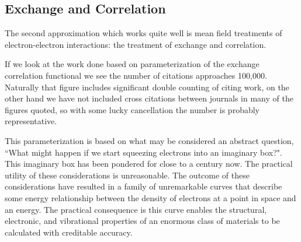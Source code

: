 \subsection{Exchange and Correlation}
The second approximation which works quite well is mean field treatments of 
electron-electron interactions: the treatment of exchange and correlation. 

If we look at the work done based on parameterization of the exchange correlation functional 
we see the number of citations approaches 100,000. Naturally that figure includes significant 
double counting of citing work, on the other hand we have not included cross citations 
between journals in many of the figures quoted, so with some lucky 
cancellation the number is probably representative. 

This parameterization is based on what may be considered an abstract question,
``What might happen if we start squeezing electrons into an imaginary box?".
This imaginary box has been pondered for close to a century now. 
The practical utility of these considerations is unreasonable. 
The outcome of these considerations have resulted in a family of 
unremarkable curves that describe some energy relationship between
the density of electrons at a point in space and an energy. 
The practical consequence is this curve enables the
structural, electronic, and vibrational properties of an 
enormous class of materials to be calculated with creditable accuracy.
%
